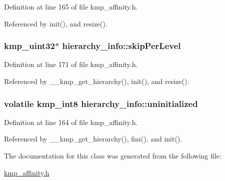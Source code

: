 Definition at line 165 of file kmp\-\_\-affinity.\-h.



Referenced by init(), and resize().

\hypertarget{classhierarchy__info_a80259c2cd48bb476b3eea860723e7fa8}{
\subsubsection[{skip\-Per\-Level}]{\setlength{\rightskip}{0pt plus 5cm}kmp\-\_\-uint32$\ast$ hierarchy\-\_\-info\-::skip\-Per\-Level}}\label{classhierarchy__info_a80259c2cd48bb476b3eea860723e7fa8}


Definition at line 171 of file kmp\-\_\-affinity.\-h.



Referenced by \-\_\-\-\_\-kmp\-\_\-get\-\_\-hierarchy(), init(), and resize().

\hypertarget{classhierarchy__info_a93f1e8f2ed894dc2477e5feb22d24c2c}{
\subsubsection[{uninitialized}]{\setlength{\rightskip}{0pt plus 5cm}volatile kmp\-\_\-int8 hierarchy\-\_\-info\-::uninitialized}}\label{classhierarchy__info_a93f1e8f2ed894dc2477e5feb22d24c2c}


Definition at line 164 of file kmp\-\_\-affinity.\-h.



Referenced by \-\_\-\-\_\-kmp\-\_\-get\-\_\-hierarchy(), fini(), and init().



The documentation for this class was generated from the following file\-:\begin{DoxyCompactItemize}
\item 
\hyperlink{kmp__affinity_8h}{kmp\-\_\-affinity.\-h}\end{DoxyCompactItemize}
